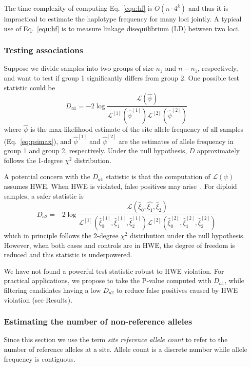 \documentclass{bioinfo}
\begin{document}
\begin{methods}
The time complexity of computing Eq.~\eqref{equ:hf} is $O(n\cdot 4^k)$ and thus
it is impractical to estimate the haplotype frequency for many loci jointly.  A
typical use of Eq.~\eqref{equ:hf} is to measure linkage disequilibrium (LD)
between two loci.

\subsubsection{Testing associations}
Suppose we divide samples into two groups of size $n_1$ and $n-n_1$,
respectively, and want to test if group 1 significantly differs from group 2.
One possible test statistic could be~\citep{Kim:2010ve,Kim:2011fk}
\begin{equation}\label{eq:asso1}
D_{a1}=-2\log\frac{\mathcal{L}(\hat{\psi})}{\mathcal{L}^{[1]}(\hat{\psi}^{[1]})\mathcal{L}^{[2]}(\hat{\psi}^{[2]})}
\end{equation}
where $\hat{\psi}$ is the max-likelihood estimate of the site allele frequency
of all samples (Eq.~\ref{eq:psimax}), and $\hat{\psi}^{[1]}$ and
$\hat{\psi}^{[2]}$ are the estimates of allele frequency in group 1 and group
2, respectively.  Under the null hypothesis, $D$ approximately follows the
1-degree $\chi^2$ distribution.

A potential concern with the $D_{a1}$ statistic is that the computation of $\mathcal{L}(\psi)$
assumes HWE.  When HWE is violated, false positives may
arise~\citep{Nielsen:2011fk}. For diploid samples, a safer statistic is
\begin{equation}\label{eq:asso2}
D_{a2}=-2\log\frac{\mathcal{L}(\hat{\xi}_0,\hat{\xi_1},\hat{\xi}_2)}
{\mathcal{L}^{[1]}(\hat{\xi}_0^{[1]},\hat{\xi}_1^{[1]},\hat{\xi}_2^{[1]})\mathcal{L}^{[2]}(\hat{\xi}_0^{[2]},\hat{\xi}_1^{[2]},\hat{\xi}_2^{[2]})}
\end{equation}
which in principle follows the 2-degree $\chi^2$ distribution under the null
hypothesis.  However, when both cases and controls are in HWE, the degree of
freedom is reduced and this statistic is underpowered.

We have not found a powerful test statistic robust to HWE violation. For
practical applications, we propose to take the P-value computed with $D_{a1}$,
while filtering candidates having a low $D_{a2}$ to reduce false positives
caused by HWE violation (see Results).

\subsubsection{Estimating the number of non-reference alleles}
Since this section we use the term \emph{site reference allele count} to refer to
the number of reference alleles at a site. Allele count is a discrete number
while allele frequency is contiguous.


\end{methods}
\end{document}
